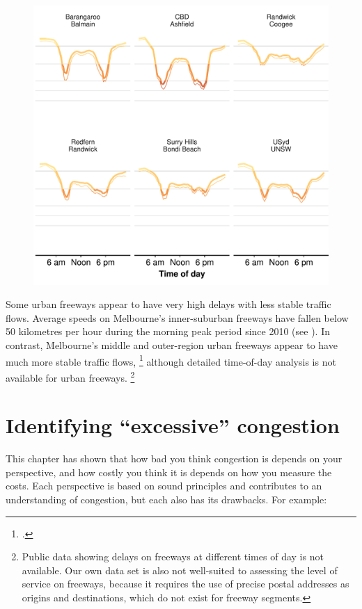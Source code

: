 \documentclass{grattan}
\begin{document}
\begin{figure}
\begin{minipage}[t][\textheight]{\columnwidth}
  \includegraphics{atlas/Avg-LOS-short-routes-SYD-1.pdf}
  \null\vfill\null
\end{minipage}
\end{figure}

Some urban freeways appear to have very high delays with less stable traffic flows. Average speeds on Melbourne's inner-suburban freeways have fallen below 50 kilometres per hour during the morning peak period since 2010 (see ). In contrast, Melbourne's middle and outer-region urban freeways appear to have much more stable traffic flows,%
    \footcite{Vicroads-201415-TravelSpeed-tableau}
although detailed time-of-day analysis is not available for urban freeways.%
    \footnote{Public data showing delays on freeways at different times of day is not available. Our own data set is also not well-suited to assessing the level of service on freeways, because it requires the use of precise postal addresses as origins and destinations, which do not exist for freeway segments.}


\section{Identifying ``excessive'' congestion}\label{sec:a-path-through}

This chapter has shown that how bad you think congestion is depends on your perspective, and how costly you think it is depends on how you measure the costs. Each perspective is based on sound principles and contributes to an understanding of congestion, but each also has its drawbacks. For example:
\end{document}
